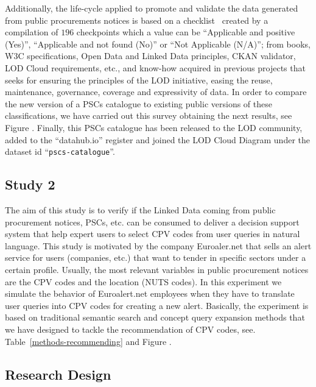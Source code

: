 Additionally, the life-cycle applied to promote and validate the data generated from public procurements notices is based on 
a checklist~\cite{} created by a compilation of $196$ checkpoints which a value can be ``Applicable and positive (Yes)'', ``Applicable and not found (No)'' or ``Not Applicable (N/A)''; 
from books, W3C specifications, Open Data and Linked Data principles, CKAN validator, LOD Cloud requirements, etc., 
and know-how acquired in previous projects that seeks for ensuring the principles of the LOD initiative, 
easing the reuse, maintenance, governance, coverage and expressivity of data. 
In order to compare the new version of a PSCs catalogue to existing public versions of these classifications, 
we have carried out this survey obtaining the next results, see Figure . Finally, this PSCs catalogue has been released to the LOD community, added to the ``datahub.io'' 
register and joined the LOD Cloud Diagram under the dataset id ``\texttt{pscs-catalogue}''.


\subsection{Study 2}
The aim of this study is to verify if the Linked Data coming from public procurement notices, PSCs, etc. can be consumed to deliver a decision support system that help expert 
users to select CPV codes from user queries in natural language. This study is motivated by the company Euroaler.net that sells an alert service for users (companies, etc.) 
that want to tender in specific sectors under a certain profile. Usually, the most relevant variables in public procurement notices are the CPV codes and the 
location (NUTS codes). In this experiment we simulate the behavior of Euroalert.net employees when they have to translate user queries into CPV codes 
for creating a new alert. Basically, the experiment is based on traditional semantic search and concept query expansion methods that we have designed to 
tackle the recommendation of CPV codes, see. Table~\ref{methods-recommending} and Figure . 
\subsection{Research Design}


